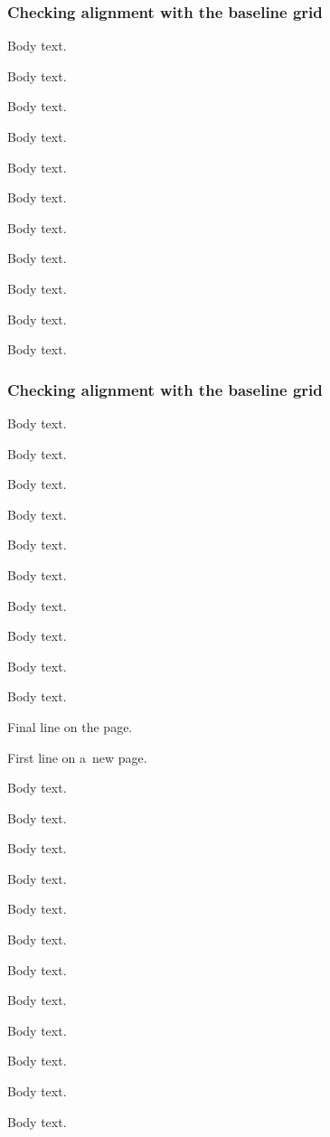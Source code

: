 \subsubsection*{Checking alignment with the baseline grid}
Body text.\displaybaselinegrid \par
Body text. \par
Body text. \par
Body text. \par
Body text. \par
Body text. \par
Body text. \par
Body text. \par
Body text. \par
Body text. \par
Body text. \par
\subsubsection*{Checking alignment with the baseline grid}
Body text. \par
Body text. \par
Body text. \par
Body text. \par
Body text. \par
Body text. \par
Body text. \par
Body text. \par
Body text. \par
Body text. \par
Final line on the page. \par

\pagebreak

First line on a~new page. \par
Body text. \par
Body text. \par
Body text. \par
Body text. \par
Body text. \par
Body text. \par
Body text. \par
Body text. \par
Body text. \par
Body text. \par
Body text. \par
Body text. \par
